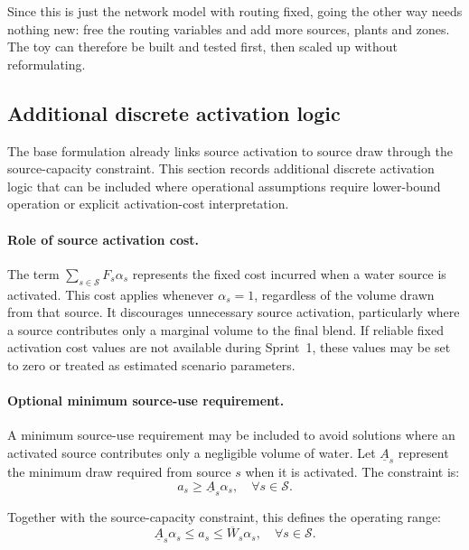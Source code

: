 \documentclass[10pt]{article}
\begin{document}
\noindent Since this is just the network model with routing fixed, going the other way needs nothing new: free the routing variables and add more sources, plants and zones.
The toy can therefore be built and tested first, then scaled up without reformulating.

\subsection{Additional discrete activation logic}

The base formulation already links source activation to source draw through the
source-capacity constraint. This section records additional discrete activation
logic that can be included where operational assumptions require lower-bound
operation or explicit activation-cost interpretation.

\paragraph{Role of source activation cost.}
The term $\sum_{s \in \mathcal{S}} F_s\alpha_s$ represents the fixed cost incurred
when a water source is activated. This cost applies whenever $\alpha_s=1$,
regardless of the volume drawn from that source. It discourages unnecessary
source activation, particularly where a source contributes only a marginal volume
to the final blend. If reliable fixed activation cost values are not available
during Sprint~1, these values may be set to zero or treated as estimated scenario
parameters.

\paragraph{Optional minimum source-use requirement.}
A minimum source-use requirement may be included to avoid solutions where an
activated source contributes only a negligible volume of water. Let
$\underline{A}_s$ represent the minimum draw required from source $s$ when it is
activated. The constraint is:
\begin{equation}
    a_s \geq \underline{A}_s \alpha_s,
    \quad \forall s \in \mathcal{S}.
\end{equation}

Together with the source-capacity constraint, this defines the operating range:
\begin{equation}
    \underline{A}_s\alpha_s
    \leq
    a_s
    \leq
    \overline{W}_s\alpha_s,
    \quad \forall s \in \mathcal{S}.
\end{equation}
\end{document}
